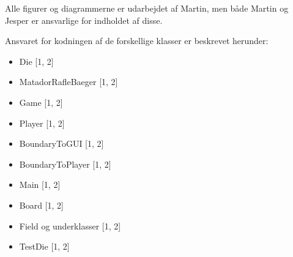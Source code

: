 Alle figurer og diagrammerne er udarbejdet af Martin, men både Martin og Jesper er ansvarlige for indholdet af disse.

Ansvaret for kodningen af de forskellige klasser er beskrevet herunder:
\begin{itemize}
\item Die [1, 2]
\item MatadorRafleBaeger [1, 2]
\item Game [1, 2]
\item Player [1, 2]
\item BoundaryToGUI [1, 2]
\item BoundaryToPlayer [1, 2]
\item Main [1, 2]
\item Board [1, 2]
\item Field og underklasser [1, 2]
\item TestDie [1, 2]
\end{itemize}